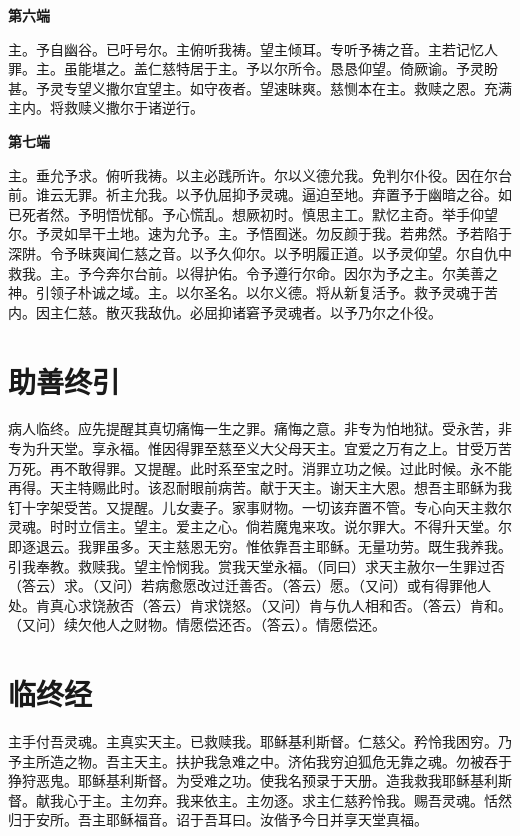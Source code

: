 \documentclass[UTF8,17pt]{ctexart}
\begin{document}
\textbf{第六端}

主。予⾃幽⾕。已吁号尔。主俯听我祷。望主倾⽿。专听予祷之⾳。主若记忆⼈罪。主。虽能堪之。盖仁慈特居于主。予以尔所令。恳恳仰望。倚厥谕。予灵盼甚。予灵专望义撒尔宜望主。如守夜者。望速昧爽。慈恻本在主。救赎之恩。充满主内。将救赎义撒尔于诸逆⾏。

\textbf{第七端}

主。垂允予求。俯听我祷。以主必践所许。尔以义德允我。免判尔仆役。因在尔台前。谁云⽆罪。祈主允我。以予仇屈抑予灵魂。逼迫⾄地。弃置予于幽暗之⾕。如已死者然。予明悟忧郁。予⼼慌乱。想厥初时。慎思主⼯。默忆主奇。举⼿仰望尔。予灵如旱⼲⼟地。速为允予。主。予悟囿迷。勿反颜于我。若弗然。予若陷于深阱。令予昧爽闻仁慈之⾳。以予久仰尔。以予明履正道。以予灵仰望。尔⾃仇中救我。主。予今奔尔台前。以得护佑。令予遵⾏尔命。因尔为予之主。尔美善之神。引领⼦朴诚之域。主。以尔圣名。以尔义德。将从新复活予。救予灵魂于苦内。因主仁慈。散灭我敌仇。必屈抑诸窘予灵魂者。以予乃尔之仆役。

\section{助善终引}

病⼈临终。应先提醒其真切痛悔⼀⽣之罪。痛悔之意。⾮专为怕地狱。受永苦，⾮专为升天堂。享永福。惟因得罪⾄慈⾄义⼤⽗母天主。宜爱之万有之上。⽢受万苦万死。再不敢得罪。又提醒。此时系⾄宝之时。消罪⽴功之候。过此时候。永不能再得。天主特赐此时。该忍耐眼前病苦。献于天主。谢天主⼤恩。想吾主耶稣为我钉⼗字架受苦。又提醒。⼉⼥妻⼦。家事财物。⼀切该弃置不管。专⼼向天主救尔灵魂。时时⽴信主。望主。爱主之⼼。倘若魔⿁来攻。说尔罪⼤。不得升天堂。尔即逐退云。我罪虽多。天主慈恩⽆穷。惟依靠吾主耶稣。⽆量功劳。既⽣我养我。引我奉教。救赎我。望主怜悯我。赏我天堂永福。（同曰）求天主赦尔⼀⽣罪过否（答云）求。（又问）若病愈愿改过迁善否。（答云）愿。（又问）或有得罪他⼈处。肯真⼼求饶赦否（答云）肯求饶怒。（又问）肯与仇⼈相和否。（答云）肯和。（又问）续⽋他⼈之财物。情愿偿还否。（答云）。情愿偿还。

\section{临终经}

主⼿付吾灵魂。主真实天主。已救赎我。耶稣基利斯督。仁慈⽗。矜怜我困穷。乃予主所造之物。吾主天主。扶护我急难之中。济佑我穷迫狐危⽆靠之魂。勿被吞于狰狩恶⿁。耶稣基利斯督。为受难之功。使我名预录于天册。造我救我耶稣基利斯督。献我⼼于主。主勿弃。我来依主。主勿逐。求主仁慈矜怜我。赐吾灵魂。恬然归于安所。吾主耶稣福⾳。诏于吾⽿⽈。汝偕予今⽇并享天堂真福。
\end{document}
